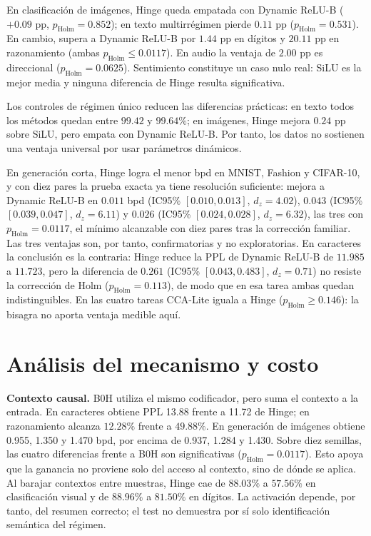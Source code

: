 \documentclass[runningheads]{llncs}
\begin{document}
En clasificación de imágenes, Hinge queda empatada con Dynamic ReLU-B ($+0.09$ pp, $p_{\mathrm{Holm}}=0.852$); en texto multirrégimen pierde $0.11$ pp ($p_{\mathrm{Holm}}=0.531$). En cambio, supera a Dynamic ReLU-B por $1.44$ pp en dígitos y $20.11$ pp en razonamiento (ambas $p_{\mathrm{Holm}}\leq0.0117$). En audio la ventaja de $2.00$ pp es direccional ($p_{\mathrm{Holm}}=0.0625$). Sentimiento constituye un caso nulo real: SiLU es la mejor media y ninguna diferencia de Hinge resulta significativa.

Los controles de régimen único reducen las diferencias prácticas: en texto todos los métodos quedan entre $99.42$ y $99.64\%$; en imágenes, Hinge mejora $0.24$ pp sobre SiLU, pero empata con Dynamic ReLU-B. Por tanto, los datos no sostienen una ventaja universal por usar parámetros dinámicos.

En generación corta, Hinge logra el menor bpd en MNIST, Fashion y CIFAR-10, y con diez pares la prueba exacta ya tiene resolución suficiente: mejora a Dynamic ReLU-B en $0.011$ bpd (IC95\% $[0.010,0.013]$, $d_z=4.02$), $0.043$ (IC95\% $[0.039,0.047]$, $d_z=6.11$) y $0.026$ (IC95\% $[0.024,0.028]$, $d_z=6.32$), las tres con $p_{\mathrm{Holm}}=0.0117$, el mínimo alcanzable con diez pares tras la corrección familiar. Las tres ventajas son, por tanto, confirmatorias y no exploratorias. En caracteres la conclusión es la contraria: Hinge reduce la PPL de Dynamic ReLU-B de $11.985$ a $11.723$, pero la diferencia de $0.261$ (IC95\% $[0.043,0.483]$, $d_z=0.71$) no resiste la corrección de Holm ($p_{\mathrm{Holm}}=0.113$), de modo que en esa tarea ambas quedan indistinguibles. En las cuatro tareas CCA-Lite iguala a Hinge ($p_{\mathrm{Holm}}\geq0.146$): la bisagra no aporta ventaja medible aquí.

\section{Análisis del mecanismo y costo}
\textbf{Contexto causal.} B0H utiliza el mismo codificador, pero suma el contexto a la entrada. En caracteres obtiene PPL 13.88 frente a 11.72 de Hinge; en razonamiento alcanza $12.28\%$ frente a $49.88\%$. En generación de imágenes obtiene 0.955, 1.350 y 1.470 bpd, por encima de 0.937, 1.284 y 1.430. Sobre diez semillas, las cuatro diferencias frente a B0H son significativas ($p_{\mathrm{Holm}}=0.0117$). Esto apoya que la ganancia no proviene solo del acceso al contexto, sino de dónde se aplica. Al barajar contextos entre muestras, Hinge cae de $88.03\%$ a $57.56\%$ en clasificación visual y de $88.96\%$ a $81.50\%$ en dígitos. La activación depende, por tanto, del resumen correcto; el test no demuestra por sí solo identificación semántica del régimen.
\end{document}
